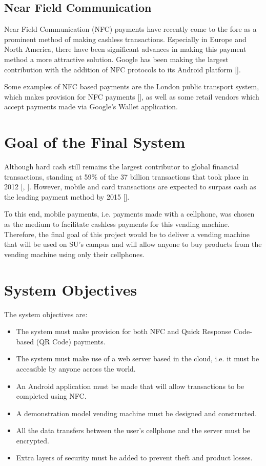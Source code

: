 \subsection{Near Field Communication}

Near Field Communication (NFC) payments have recently come to the fore as a
prominent method of making cashless transactions. Especially in Europe and North
America, there have been significant advances in making this payment method a
more attractive solution. Google has been making the largest contribution with
the addition of NFC protocols to its Android
platform [\cite{website:android-gingerbread}].

Some examples of NFC based payments are the London public transport system, which makes
provision for NFC payments [\cite{article:nfc-underground}], as well as some retail vendors
which accept payments made via Google's Wallet application.

\section{Goal of the Final System}
\label{sec:final-system-goal}

Although hard cash still remains the largest contributor to global financial transactions,
standing at 59\% of the 37 billion transactions that took place in 2012
[\cite{article:money-transactions}, \cite{website:money-transactions}]. However,
mobile and card transactions are expected to surpass cash as the leading
payment method by 2015 [\cite{article:cashless-transactions}].

To this end, mobile payments, i.e. payments made with a cellphone, was chosen
as the medium to facilitate cashless payments for this vending machine.
Therefore, the final goal of this project would be to deliver a vending machine
that will be used on SU's campus and will allow anyone to buy products from
the vending machine using only their cellphones.

\section{System Objectives}
\label{sec:objectives}

The system objectives are:

\begin{itemize}
  \item The system must make provision for both NFC and Quick Response Code-based (QR
  Code) payments.
  \item The system must make use of a web server based in the cloud, i.e. it
  must be accessible by anyone across the world.
  \item An Android application must be made that will allow transactions to be completed
  using NFC.
  \item A demonstration model vending machine must be designed and constructed.
  \item All the data transfers between the user's cellphone and the server must be
  encrypted.
  \item Extra layers of security must be added to prevent theft and product
  losses.
\end{itemize}

